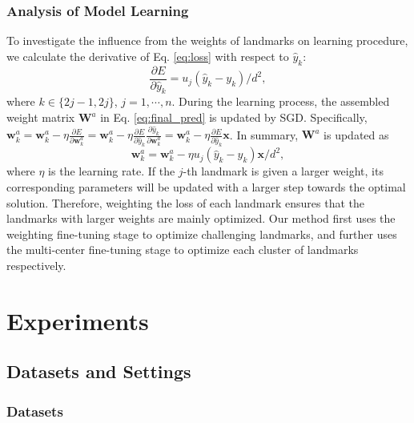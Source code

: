 \documentclass[journal]{IEEEtran}
\begin{document}
\subsubsection{Analysis of Model Learning}

To investigate the influence from the weights of landmarks on learning procedure, we calculate the derivative of Eq. \ref{eq:loss} with respect to $\hat{y}_k$:
\begin{equation}
\frac{\partial E}{\partial \hat{y}_k}= u_j(\hat{y}_k-y_k)/d^2,
\end{equation}
where $k\in\{2j-1, 2j\}$, $j=1,\cdots,n$. During the learning process, the assembled weight matrix $\mathbf{W}^a$ in Eq. \ref{eq:final_pred} is updated by SGD. Specifically, $\mathbf{w}^{a}_k=\mathbf{w}^{a}_k-\eta \frac{\partial E}{\partial \mathbf{w}^{a}_k} = \mathbf{w}^{a}_k-\eta \frac{\partial E}{\partial \hat{y}_k} \frac{\partial \hat{y}_k}{\partial \mathbf{w}^{a}_k} = \mathbf{w}^{a}_k-\eta \frac{\partial E}{\partial \hat{y}_k} \mathbf{x}$. In summary, $\mathbf{W}^a$ is updated as
\begin{equation}
\mathbf{w}^{a}_k = \mathbf{w}^{a}_k-\eta u_j(\hat{y}_k-y_k) \mathbf{x} /d^2,
\end{equation}
where $\eta$ is the learning rate. If the $j$-th landmark is given a larger weight, its corresponding parameters will be updated with a larger step towards the optimal solution. Therefore, weighting the loss of each landmark ensures that the landmarks with larger weights are mainly optimized. Our method first uses the weighting fine-tuning stage to optimize challenging landmarks, and further uses the multi-center fine-tuning stage to optimize each cluster of landmarks respectively.

\section{Experiments}
\label{sec:experi}

\subsection{Datasets and Settings}

\subsubsection{Datasets}
\end{document}
